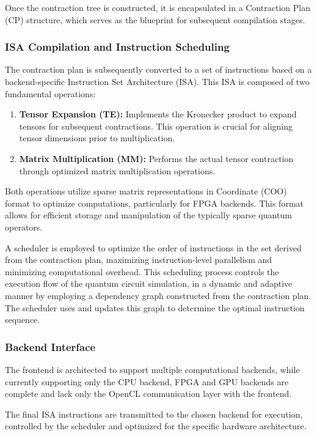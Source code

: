 \documentclass[12pt,oneside,a4paper]{article}
\begin{document}
Once the contraction tree is constructed, it is encapsulated in a Contraction Plan (CP) structure, which serves as the blueprint for subsequent compilation stages.

\subsubsection{ISA Compilation and Instruction Scheduling}

The contraction plan is subsequently converted to a set of instructions based on a backend-specific Instruction Set Architecture (ISA). This ISA is composed of two fundamental operations:

\begin{enumerate}
    \item \textbf{Tensor Expansion (TE):} Implements the Kronecker product to expand tensors for subsequent contractions. This operation is crucial for aligning tensor dimensions prior to multiplication.
    \item \textbf{Matrix Multiplication (MM):} Performs the actual tensor contraction through optimized matrix multiplication operations.
\end{enumerate}

Both operations utilize sparse matrix representations in Coordinate (COO) format to optimize computations, particularly for FPGA backends. This format allows for efficient storage and manipulation of the typically sparse quantum operators.

A scheduler is employed to optimize the order of instructions in the set derived from the contraction plan, maximizing instruction-level parallelism and minimizing computational overhead. This scheduling process controls the execution flow of the quantum circuit simulation, in a dynamic and adaptive manner by employing a dependency graph constructed from the contraction plan. The scheduler uses and updates this graph to determine the optimal instruction sequence.

\subsubsection{Backend Interface}

The frontend is architected to support multiple computational backends, while currently supporting only the CPU backend, FPGA and GPU backends are complete and lack only the OpenCL communication layer with the frontend.

The final ISA instructions are transmitted to the chosen backend for execution, controlled by the scheduler and optimized for the specific hardware architecture.
\end{document}
